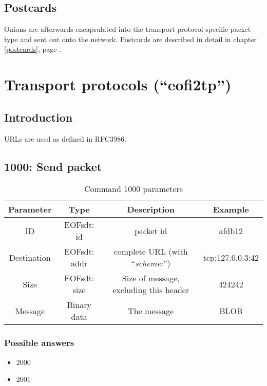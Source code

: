 \documentclass[12pt,a4paper]{book}
\begin{document}
\subsection{Postcards}
Onions are afterwards encapsulated into the transport protocol specific
packet type and sent out onto the network.
Postcards are described in detail in chapter \ref{postcards}, page \pageref{postcards}.
\section{Transport protocols ("`eofi2tp"')}
\label{eofi2tp}
\subsection{Introduction}
URLs are used as defined in RFC3986\cite{uri-1}.
\subsection{1000: Send packet}
\begin{longtable}{|c|c|c|c|}
\caption{Command 1000 parameters}\\
\hline
\textbf{Parameter} & \textbf{Type} & \textbf{Description} & \textbf{Example}\\
\hline
ID & EOFsdt: id & packet id & afdb12\\
\hline
Destination & EOFsdt: addr & complete URL (with "`\emph{scheme:}"') & tcp:127.0.0.3:42\\
\hline
Size & EOFsdt: size & Size of message, excluding this header & 424242\\
\hline
Message & Binary data & The message & BLOB\\
\hline
\end{longtable}
\subsubsection{Possible answers}
\begin{itemize}
\item 2000
\item 2001
\end{itemize}
\end{document}
